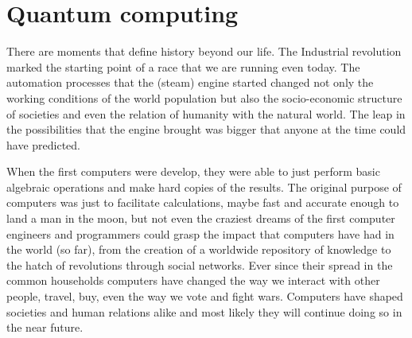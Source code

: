 \chapter{Quantum computing}
%
%
%

There are moments that define history beyond our life. The Industrial revolution marked the starting point of a race that we are running even today. The automation processes that the (steam) engine started changed not only the working conditions of the world population but also the socio-economic structure of societies and even the relation of humanity with the natural world. %
The leap in the possibilities that the engine brought was bigger that anyone at the time could have predicted.

When the first computers were develop, they were able to just perform basic algebraic operations and make hard copies of the results. %
The original purpose of computers was just to facilitate calculations, maybe fast and accurate enough to land a man in the moon, but not even the craziest dreams of the first computer engineers and programmers could grasp the impact that computers have had in the world (so far), from the creation of a worldwide repository of knowledge\cite{Stallman2000} to the hatch of revolutions through social networks\cite{Alhindi2012}. Ever since their spread in the common households computers have changed the way we interact with other people, travel, buy, even the way we vote and fight wars.
Computers have shaped societies and human relations alike and most likely they will continue doing so in the near future.

